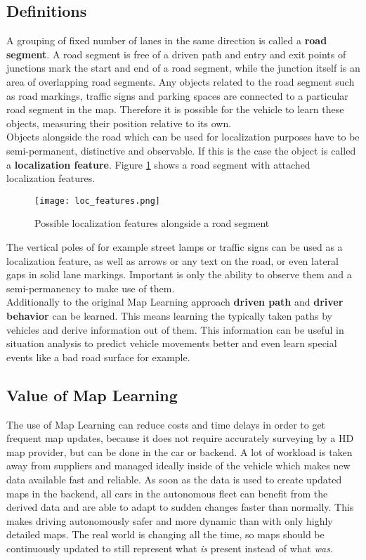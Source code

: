 \subsection{Definitions}
\label{ml_def}
A grouping of fixed number of lanes in the same direction is called a \textbf{road segment}. A road segment is free of a driven path and entry and exit points of junctions mark the start and end of a road segment, while the junction itself is an area of overlapping road segments. Any objects related to the road segment such as road markings, traffic signs and parking spaces are connected to a particular road segment in the map. Therefore it is possible for the vehicle to learn these objects, measuring their position relative to its own.\\
Objects alongside the road which can be used for localization purposes have to be semi-permanent, distinctive and observable. If this is the case the object is called a \textbf{localization feature}. Figure \ref{loc_features} shows a road segment with attached localization features.
\begin{figure}[!hbt]
\texttt{[image: loc\_features.png]}
\caption{Possible localization features alongside a road segment\cite{confluence_maplearning}}
\label{loc_features}
\end{figure}
The vertical poles of for example street lamps or traffic signs can be used as a localization feature, as well as arrows or any text on the road, or even lateral gaps in solid lane markings. Important is only the ability to observe them and a semi-permanency to make use of them.\\
Additionally to the original Map Learning approach \textbf{driven path} and \textbf{driver behavior} can be learned. This means learning the typically taken paths by vehicles and derive information out of them. This information can be useful in situation analysis to predict vehicle movements better and even learn special events like a bad road surface for example.
\subsection{Value of Map Learning}
\label{ml_value}
The use of Map Learning can reduce costs and time delays in order to get frequent map updates, because it does not require accurately surveying by a HD map provider, but can be done in the car or backend. A lot of workload is taken away from suppliers and managed ideally inside of the vehicle which makes new data available fast and reliable. As soon as the data is used to create updated maps in the backend, all cars in the autonomous fleet can benefit from the derived data and are able to adapt to sudden changes faster than normally. This makes driving autonomously safer and more dynamic than with only highly detailed maps. The real world is changing all the time, so maps should be continuously updated to still represent what \emph{is} present instead of what \emph{was}.